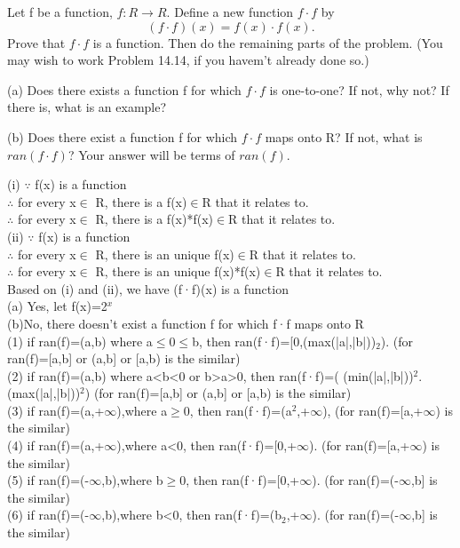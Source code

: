\documentclass[11pt, a4paper, UTF8]{ctexart}
\begin{document}
\begin{problem}[UD:14.15]
Let f be a function, \(f:R \rightarrow R\). Define a new function \(f\cdot f\) by 
\[(f\cdot f)(x) = f(x) \cdot f(x).\]
Prove that \(f \cdot f\) is a function. Then do the remaining parts of the problem. (You may wish to work Problem 14.14, if you havem't already done so.)

(a) Does there exists a function f for which \(f\cdot f\) is one-to-one? If not, why not? If there is, what is an example?

(b) Does there exist a function f for which \(f\cdot f\) maps onto R? If not, what is \(ran(f\cdot f)\)? Your answer will be terms of \(ran(f)\).
\end{problem}
\begin{solution}
(i) $\because$ f(x) is a function\\
$\therefore$ for every x$\in$ R, there is a f(x)$\in$R that it relates to.\\
$\therefore$ for every x$\in$ R, there is a f(x)*f(x)$\in$R that it relates to.\\
(ii) $\because$ f(x) is a function\\
$\therefore$ for every x$\in$ R, there is an unique f(x)$\in$R that it relates to.\\
$\therefore$ for every x$\in$ R, there is an unique f(x)*f(x)$\in$R that it relates to.\\
Based on (i) and (ii), we have (f·f)(x) is a function\\
(a) Yes, let f(x)=2$^x$\\
(b)No, there doesn't exist a function f for which f·f maps onto R\\
(1) if ran(f)=(a,b) where a$\le$0$\le$b, then ran(f·f)=[0,(max(|a|,|b|))$_2$). (for ran(f)=[a,b] or (a,b] or [a,b) is the similar)\\
(2) if ran(f)=(a,b) where a<b<0 or b>a>0, then ran(f·f)=( (min(|a|,|b|))$^2$. (max(|a|,|b|))$^2$) (for ran(f)=[a,b] or (a,b] or [a,b) is the similar)\\
(3) if ran(f)=(a,+$\infty$),where a$\ge$0, then ran(f·f)=(a$^2$,+$\infty$), (for ran(f)=[a,+$\infty$) is the similar)\\
(4) if ran(f)=(a,+$\infty$),where a<0, then ran(f·f)=[0,+$\infty$). (for ran(f)=[a,+$\infty$) is the similar)\\
(5) if ran(f)=(-$\infty$,b),where b$\ge$0, then ran(f·f)=[0,+$\infty$). (for ran(f)=(-$\infty$,b] is the similar)\\
(6) if ran(f)=(-$\infty$,b),where b<0, then ran(f·f)=(b$_2$,+$\infty$). (for ran(f)=(-$\infty$,b] is the similar)\\
\end{solution}
\end{document}
